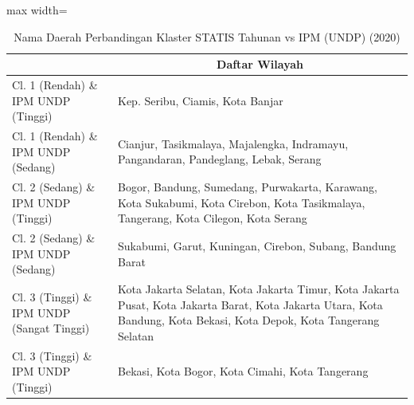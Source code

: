 \begin{table}[H]
\centering
\caption{Nama Daerah Perbandingan Klaster STATIS Tahunan vs IPM (UNDP) (2020)} \label{tab:app1statis_ipm_name_2020}
\begin{adjustbox}{max width=\textwidth}
\begin{tabular}{|>{\centering\arraybackslash}p{4cm}|p{10cm}|}
\hline
\multicolumn{1}{|c|}{\textbf{Kategori}} & \multicolumn{1}{c|}{\textbf{Daftar Wilayah}} \\
\hline
Cl. 1 (Rendah) \& IPM UNDP (Tinggi) & Kep. Seribu, Ciamis, Kota Banjar \\
\hline
Cl. 1 (Rendah) \& IPM UNDP (Sedang) & Cianjur, Tasikmalaya, Majalengka, Indramayu, Pangandaran, Pandeglang, Lebak, Serang \\
\hline
Cl. 2 (Sedang) \& IPM UNDP (Tinggi) & Bogor, Bandung, Sumedang, Purwakarta, Karawang, Kota Sukabumi, Kota Cirebon, Kota Tasikmalaya, Tangerang, Kota Cilegon, Kota Serang \\
\hline
Cl. 2 (Sedang) \& IPM UNDP (Sedang) & Sukabumi, Garut, Kuningan, Cirebon, Subang, Bandung Barat \\
\hline
Cl. 3 (Tinggi) \& IPM UNDP (Sangat Tinggi) & Kota Jakarta Selatan, Kota Jakarta Timur, Kota Jakarta Pusat, Kota Jakarta Barat, Kota Jakarta Utara, Kota Bandung, Kota Bekasi, Kota Depok, Kota Tangerang Selatan \\
\hline
Cl. 3 (Tinggi) \& IPM UNDP (Tinggi) & Bekasi, Kota Bogor, Kota Cimahi, Kota Tangerang \\
\hline
\end{tabular}
\end{adjustbox}
\end{table}